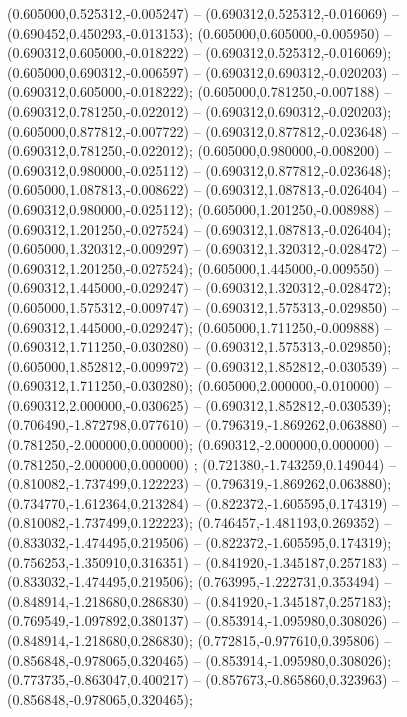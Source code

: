  (0.605000,0.525312,-0.005247) -- (0.690312,0.525312,-0.016069) -- (0.690452,0.450293,-0.013153);
 (0.605000,0.605000,-0.005950) -- (0.690312,0.605000,-0.018222) -- (0.690312,0.525312,-0.016069);
 (0.605000,0.690312,-0.006597) -- (0.690312,0.690312,-0.020203) -- (0.690312,0.605000,-0.018222);
 (0.605000,0.781250,-0.007188) -- (0.690312,0.781250,-0.022012) -- (0.690312,0.690312,-0.020203);
 (0.605000,0.877812,-0.007722) -- (0.690312,0.877812,-0.023648) -- (0.690312,0.781250,-0.022012);
 (0.605000,0.980000,-0.008200) -- (0.690312,0.980000,-0.025112) -- (0.690312,0.877812,-0.023648);
 (0.605000,1.087813,-0.008622) -- (0.690312,1.087813,-0.026404) -- (0.690312,0.980000,-0.025112);
 (0.605000,1.201250,-0.008988) -- (0.690312,1.201250,-0.027524) -- (0.690312,1.087813,-0.026404);
 (0.605000,1.320312,-0.009297) -- (0.690312,1.320312,-0.028472) -- (0.690312,1.201250,-0.027524);
 (0.605000,1.445000,-0.009550) -- (0.690312,1.445000,-0.029247) -- (0.690312,1.320312,-0.028472);
 (0.605000,1.575312,-0.009747) -- (0.690312,1.575313,-0.029850) -- (0.690312,1.445000,-0.029247);
 (0.605000,1.711250,-0.009888) -- (0.690312,1.711250,-0.030280) -- (0.690312,1.575313,-0.029850);
 (0.605000,1.852812,-0.009972) -- (0.690312,1.852812,-0.030539) -- (0.690312,1.711250,-0.030280);
 (0.605000,2.000000,-0.010000) -- (0.690312,2.000000,-0.030625) -- (0.690312,1.852812,-0.030539);
 (0.706490,-1.872798,0.077610) -- (0.796319,-1.869262,0.063880) -- (0.781250,-2.000000,0.000000);
 (0.690312,-2.000000,0.000000) -- (0.781250,-2.000000,0.000000) ;
 (0.721380,-1.743259,0.149044) -- (0.810082,-1.737499,0.122223) -- (0.796319,-1.869262,0.063880);
 (0.734770,-1.612364,0.213284) -- (0.822372,-1.605595,0.174319) -- (0.810082,-1.737499,0.122223);
 (0.746457,-1.481193,0.269352) -- (0.833032,-1.474495,0.219506) -- (0.822372,-1.605595,0.174319);
 (0.756253,-1.350910,0.316351) -- (0.841920,-1.345187,0.257183) -- (0.833032,-1.474495,0.219506);
 (0.763995,-1.222731,0.353494) -- (0.848914,-1.218680,0.286830) -- (0.841920,-1.345187,0.257183);
 (0.769549,-1.097892,0.380137) -- (0.853914,-1.095980,0.308026) -- (0.848914,-1.218680,0.286830);
 (0.772815,-0.977610,0.395806) -- (0.856848,-0.978065,0.320465) -- (0.853914,-1.095980,0.308026);
 (0.773735,-0.863047,0.400217) -- (0.857673,-0.865860,0.323963) -- (0.856848,-0.978065,0.320465);
